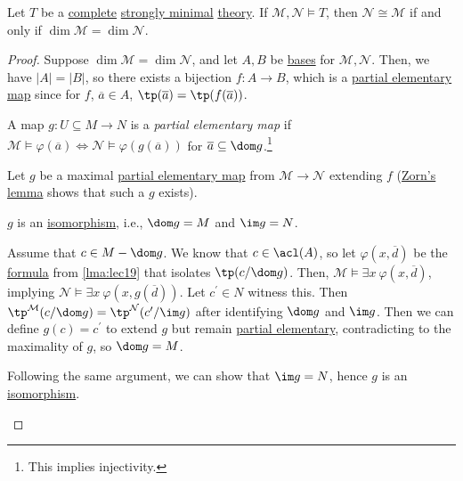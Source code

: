 \begin{theorem}
	Let \(T\) be a \hyperref[def:theory-complete]{complete} \hyperref[def:strongly-minimal]{strongly minimal} \hyperref[def:theory]{theory}. If \(\mathcal{M} , \mathcal{N} \models T\), then \(\mathcal{N} \cong \mathcal{M} \) if and only if \(\dim \mathcal{M} = \dim \mathcal{N} \).
\end{theorem}
\begin{proof}
	Suppose \(\dim \mathcal{M} = \dim \mathcal{N} \), and let \(A, B\) be \hyperref[def:basis]{bases} for \(\mathcal{M} , \mathcal{N} \). Then, we have \(\vert A \vert = \vert B \vert \), so there exists a bijection \(f\colon A \to B\), which is a \hyperref[not:partial-elementary-map]{partial elementary map} since for \(f\), \(\overline{a} \in A\), \(\tp(\overline{a} ) = \tp(f(\overline{a} ))\).

	\begin{notation}\label{not:partial-elementary-map}
		A map \(g \colon U \subseteq M \to N\) is a \emph{partial elementary map} if \(\mathcal{M} \models \varphi (\overline{a} ) \iff \mathcal{N} \models \varphi (g(\overline{a} ))\) for \(\overline{a} \subseteq \dom g\).\footnote{This implies injectivity.}
	\end{notation}

	Let \(g\) be a maximal \hyperref[not:partial-elementary-map]{partial elementary map} from \(\mathcal{M} \to  \mathcal{N} \) extending \(f\) (\hyperref[thm:Zorn]{Zorn's lemma} shows that such a \(g\) exists).

	\begin{claim}
		\(g\) is an \hyperref[def:isomorphism]{isomorphism}, i.e., \(\dom g = M \) and \(\im g = N\).
	\end{claim}
	\begin{explanation}
		Assume that \(c \in M - \dom g\). We know that \(c\in \acl(A)\), so let \(\varphi (x, \overline{d} )\) be the \hyperref[def:formula]{formula} from \autoref{lma:lec19} that isolates \(\tp(c / \dom g)\). Then, \(\mathcal{M} \models \exists x\ \varphi (x, \overline{d} )\), implying \(\mathcal{N} \models \exists x\ \varphi (x, g(\overline{d} ))\). Let \(c^{\prime} \in N\) witness this. Then \(\tp^{\mathcal{M} } (c / \dom g) = \tp^{\mathcal{N} } (c^{\prime} / \im g)\) after identifying \(\dom g\) and \(\im g\). Then we can define \(g(c) = c^{\prime} \) to extend \(g\) but remain \hyperref[not:partial-elementary-map]{partial elementary}, contradicting to the maximality of \(g\), so \(\dom g = M\).

		Following the same argument, we can show that \(\im g = N\), hence \(g\) is an \hyperref[def:isomorphism]{isomorphism}.
	\end{explanation}
\end{proof}